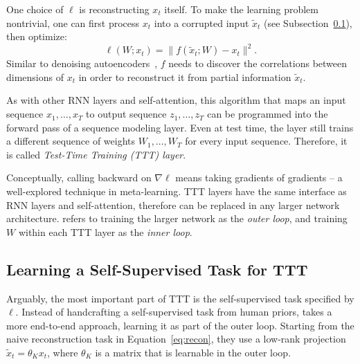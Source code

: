 \noindent
One choice of $\ell$ is reconstructing $x_t$ itself. 
To make the learning problem nontrivial, one can first process $x_t$ into a corrupted input $\tilde{x}_t$ (see Subsection~\ref{subsec:task}), then optimize:
\begin{equation}    
\label{eq:recon}
\ell(W; x_t) = \| f(\tilde{x}_t; W) - x_t \|^2.
\end{equation}
Similar to denoising autoencoders~\citep{denoisingautoencoder}, $f$ needs to discover the correlations between dimensions of $x_t$ in order to reconstruct it from partial information $\tilde{x}_t$.

As with other RNN layers and self-attention, this algorithm that maps an input sequence $x_1,\dots,x_T$ to output sequence $z_1,\dots,z_T$ can be programmed into the forward pass of a sequence modeling layer.
Even at test time, the layer still trains a different sequence of weights $W_1, \dots, W_T$ for every input sequence. Therefore, it is called \emph{Test-Time Training (TTT) layer}.

Conceptually, calling backward on $\nabla\ell$ means taking gradients of gradients -- a well-explored technique in meta-learning.
TTT layers have the same interface as RNN layers and self-attention, therefore can be replaced in any larger network architecture. \cite{sun2024ttt} refers to training the larger network as the \emph{outer loop}, and training $W$ within each TTT layer as the \emph{inner loop}.

\subsection{Learning a Self-Supervised Task for TTT}
\label{subsec:task}
Arguably, the most important part of TTT is the self-supervised task specified by $\ell$. Instead of handcrafting a self-supervised task from human priors, \cite{sun2024ttt} takes a more end-to-end approach, learning it as part of the outer loop.
Starting from the naive reconstruction task in Equation~\ref{eq:recon}, they use a low-rank projection $\tilde{x}_t = \theta_Kx_t$, where $\theta_K$ is a matrix that is learnable in the outer loop.

